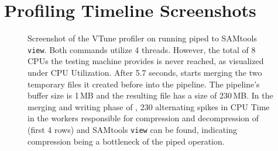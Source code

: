 \section{Profiling Timeline Screenshots}

\begin{figure}
\caption{Screenshot of the VTune profiler on running \sort piped to SAMtools \texttt{view}. Both commands utilize 4 threads. However, the total of 8 CPUs the testing machine provides is never reached, as visualized under CPU Utilization. After 5.7 seconds, \sort starts merging the two temporary files it created before into the pipeline. The pipeline's buffer size is 1\,MB and the resulting file has a size of 230\,MB. In the merging and writing phase of \sort, 230 alternating spikes in CPU Time in the workers responsible for compression and decompression of \sort (first 4 rows) and SAMtools \texttt{view} can be found, indicating compression being a bottleneck of the piped operation.} \label{fig1}
\end{figure}



\newpage